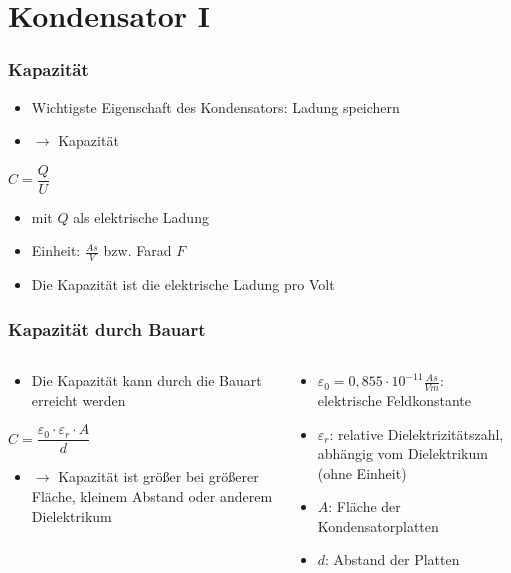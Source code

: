 
\section{Kondensator I}
\label{section:kondensator_1}
\begin{frame}%

\frametitle{Kapazität}
\begin{itemize}
  \item Wichtigste Eigenschaft des Kondensators: Ladung speichern
  \item $\rightarrow$ Kapazität
  \end{itemize}
$C = \dfrac{Q}{U}$

\begin{itemize}
  \item mit $Q$ als elektrische Ladung
  \item Einheit: $\frac{As}{V}$ bzw. Farad $F$
  \item Die Kapazität ist die elektrische Ladung pro Volt
  \end{itemize}

\end{frame}

\begin{frame}
\frametitle{Kapazität durch Bauart}
\begin{columns}
    \begin{column}{0.48\textwidth}
    \begin{itemize}
  \item Die Kapazität kann durch die Bauart erreicht werden
  \end{itemize}
$C = \dfrac{\varepsilon_0 \cdot \varepsilon_r \cdot A}{d}$

\begin{itemize}
  \item $\rightarrow$ Kapazität ist größer bei größerer Fläche, kleinem Abstand oder anderem Dielektrikum
  \end{itemize}

    \end{column}
   \begin{column}{0.48\textwidth}
       \begin{itemize}
  \item $\varepsilon_0 = 0,855 \cdot 10^{-11}\frac{As}{Vm}$: elektrische Feldkonstante
  \item $\varepsilon_r$: relative Dielektrizitätszahl, abhängig vom Dielektrikum (ohne Einheit)
  \item $A$: Fläche der Kondensatorplatten
  \item $d$: Abstand der Platten
  \end{itemize}

   \end{column}
\end{columns}

\end{frame}

